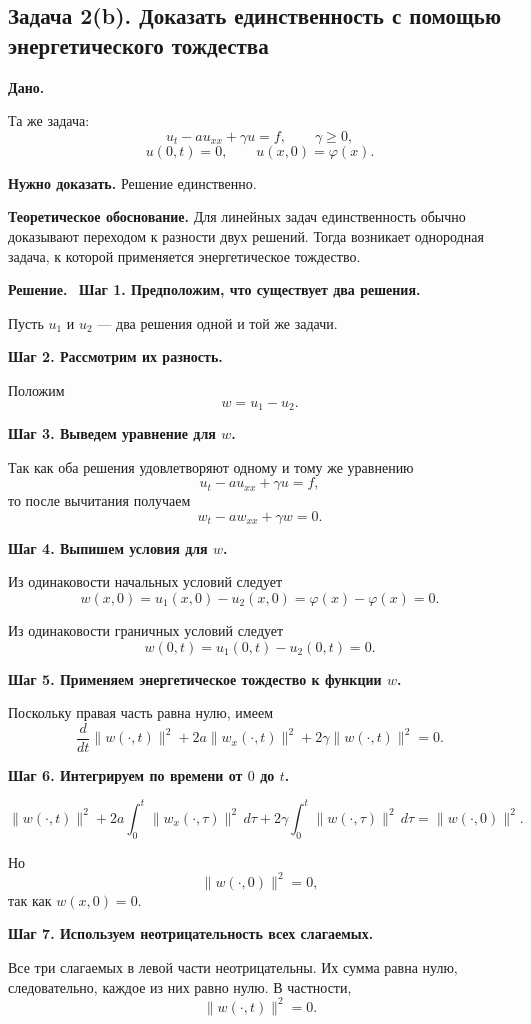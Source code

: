 \documentclass[a4paper,12pt]{article}
\newcommand{\Solution}{\textbf{Решение.}\ }
\begin{document}
\subsection*{Задача 2(b). Доказать единственность с помощью энергетического тождества}

\textbf{Дано.}

Та же задача:
\[
u_t-a u_{xx}+\gamma u=f,
\qquad \gamma\ge 0,
\]
\[
u(0,t)=0,
\qquad
u(x,0)=\varphi(x).
\]

\textbf{Нужно доказать.} Решение единственно.

\textbf{Теоретическое обоснование.}
Для линейных задач единственность обычно доказывают переходом к разности двух решений. Тогда возникает однородная задача, к которой применяется энергетическое тождество.

\Solution
\textbf{Шаг 1. Предположим, что существует два решения.}

Пусть $u_1$ и $u_2$ --- два решения одной и той же задачи.

\textbf{Шаг 2. Рассмотрим их разность.}

Положим
\[
w=u_1-u_2.
\]

\textbf{Шаг 3. Выведем уравнение для $w$.}

Так как оба решения удовлетворяют одному и тому же уравнению
\[
u_t-a u_{xx}+\gamma u=f,
\]
то после вычитания получаем
\[
w_t-a w_{xx}+\gamma w=0.
\]

\textbf{Шаг 4. Выпишем условия для $w$.}

Из одинаковости начальных условий следует
\[
w(x,0)=u_1(x,0)-u_2(x,0)=\varphi(x)-\varphi(x)=0.
\]

Из одинаковости граничных условий следует
\[
w(0,t)=u_1(0,t)-u_2(0,t)=0.
\]

\textbf{Шаг 5. Применяем энергетическое тождество к функции $w$.}

Поскольку правая часть равна нулю, имеем
\[
\frac{d}{dt}\|w(\cdot,t)\|^2
+2a\|w_x(\cdot,t)\|^2
+2\gamma\|w(\cdot,t)\|^2
=0.
\]

\textbf{Шаг 6. Интегрируем по времени от $0$ до $t$.}

\[
\|w(\cdot,t)\|^2
+2a\int_0^t \|w_x(\cdot,\tau)\|^2\,d\tau
+2\gamma\int_0^t \|w(\cdot,\tau)\|^2\,d\tau
=
\|w(\cdot,0)\|^2.
\]

Но
\[
\|w(\cdot,0)\|^2=0,
\]
так как $w(x,0)=0$.

\textbf{Шаг 7. Используем неотрицательность всех слагаемых.}

Все три слагаемых в левой части неотрицательны. Их сумма равна нулю, следовательно, каждое из них равно нулю. В частности,
\[
\|w(\cdot,t)\|^2=0.
\]
\end{document}
